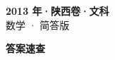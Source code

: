 \documentclass[zihao=-4, a4paper]{ctexart}
\begin{document}
\begin{center}
  {\Large\bfseries 2013 年·陕西卷·文科}\\[4pt]
  {\large 数学 · 简答版}
\end{center}
\medskip
{}

\clearpage
{}
\begin{center}{\Large\bfseries 答案速查}\end{center}
\medskip

\end{document}
